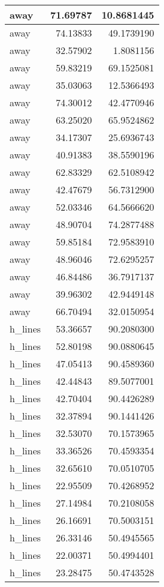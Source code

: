 \documentclass[
]{book}
\theoremstyle{definition}
\theoremstyle{definition}
\theoremstyle{definition}
\theoremstyle{definition}
\theoremstyle{remark}
\begin{document}
\begin{tabular}{l|r|r}
\hline
away & 71.69787 & 10.8681445\\
\hline
away & 74.13833 & 49.1739190\\
\hline
away & 32.57902 & 1.8081156\\
\hline
away & 59.83219 & 69.1525081\\
\hline
away & 35.03063 & 12.5366493\\
\hline
away & 74.30012 & 42.4770946\\
\hline
away & 63.25020 & 65.9524862\\
\hline
away & 34.17307 & 25.6936743\\
\hline
away & 40.91383 & 38.5590196\\
\hline
away & 62.83329 & 62.5108942\\
\hline
away & 42.47679 & 56.7312900\\
\hline
away & 52.03346 & 64.5666620\\
\hline
away & 48.90704 & 74.2877488\\
\hline
away & 59.85184 & 72.9583910\\
\hline
away & 48.96046 & 72.6295257\\
\hline
away & 46.84486 & 36.7917137\\
\hline
away & 39.96302 & 42.9449148\\
\hline
away & 66.70494 & 32.0150954\\
\hline
h\_lines & 53.36657 & 90.2080300\\
\hline
h\_lines & 52.80198 & 90.0880645\\
\hline
h\_lines & 47.05413 & 90.4589360\\
\hline
h\_lines & 42.44843 & 89.5077001\\
\hline
h\_lines & 42.70404 & 90.4426289\\
\hline
h\_lines & 32.37894 & 90.1441426\\
\hline
h\_lines & 32.53070 & 70.1573965\\
\hline
h\_lines & 33.36526 & 70.4593354\\
\hline
h\_lines & 32.65610 & 70.0510705\\
\hline
h\_lines & 22.95509 & 70.4268952\\
\hline
h\_lines & 27.14984 & 70.2108058\\
\hline
h\_lines & 26.16691 & 70.5003151\\
\hline
h\_lines & 26.33146 & 50.4945565\\
\hline
h\_lines & 22.00371 & 50.4994401\\
\hline
h\_lines & 23.28475 & 50.4743528\\

\end{tabular}
\end{document}
